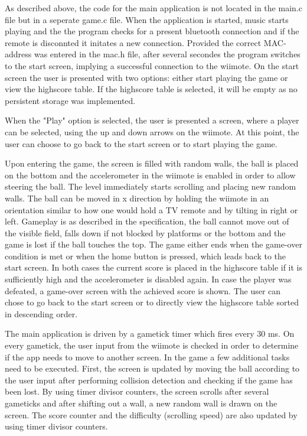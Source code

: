 \documentclass[12pt,a4paper,titlepage,oneside]{article}
\begin{document}
As described above, the code for the main application is not located in the
main.c file but in a seperate game.c file. When the application is started,
music starts playing and the
the program checks for a present bluetooth connection and if the remote is
disconnted it initates a new connection. Provided the correct MAC-address
was entered in the mac.h file, after several secondes the program switches
to the start screen, implying a successful connection to the wiimote. On the
start screen the user is presented with two options: either start playing the
game or view the highscore table. If the highscore table is selected, it will
be empty as no persistent storage was implemented.

When the "Play" option is
selected, the user is presented a screen, where a player can be selected, using
the up and down arrows on the wiimote. At this point, the user can choose to
go back to the start screen or to start playing the game.

Upon entering the
game, the screen is filled with random walls, the ball is placed on the bottom
and the accelerometer in the wiimote is enabled in order to allow steering the
ball. The level immediately starts scrolling and placing new random walls. The
ball can be moved in x direction by holding the wiimote in an orientation similar
to how one would hold a TV remote and by tilting in right or left. Gameplay is
as described in the specification, the ball cannot move out of the visible 
field, falls down if not blocked by platforms or the bottom and the game is lost
if the ball touches the top. The game either ends when the game-over condition is
met or when the home button is pressed, which leads back to the start screen.
In both cases the current score is placed in the highscore table if it is 
sufficiently high and the accelerometer is disabled again. In case the player 
was defeated, a game-over screen with the achieved score is shown. The user
can chose to go back to the start screen or to directly view the highscore
table sorted in descending order.

The main application is driven by a gametick timer which fires every 30 ms.
On every gametick, the user input from the wiimote is checked in order to
determine if the app needs to move to another screen. In the game a few
additional tasks need to be executed. First, the screen is updated by moving
the ball according to the user input after performing collision detection and
checking if the game has been lost. By using timer divisor counters, the screen
scrolls after several gameticks and after shifting out a wall, a new random
wall is drawn on the screen. The score counter and the difficulty (scrolling
speed) are also updated by using timer divisor counters.
\end{document}
